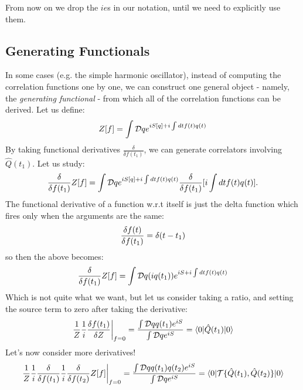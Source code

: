 From now on we drop the $ie$s in our notation, until we need to explicitly use them.

\subsection{Generating Functionals}
In some cases (e.g. the simple harmonic oscillator), instead of computing the correlation functions one by one, we can construct one general object - namely, the \emph{generating functional} - from which all of the correlation functions can be derived. Let us define:
\begin{equation}
    Z[f] = \int \mathcal{D} q e^{iS[q] + i\int dt f(t)q(t)}
\end{equation} 
By taking functional derivatives $\frac{\delta}{\delta f(t_1)}$, we can generate correlators involving $\hat{Q}(t_1)$. Let us study:
\begin{equation}
    \frac{\delta }{\delta f(t_1)}Z[f] = \int \mathcal{D} q e^{iS[q] + i\int dt f(t)q(t)}\frac{\delta }{\delta f(t_1)}[i\int dt f(t)q(t)].
\end{equation}
The functional derivative of a function w.r.t itself is just the delta function which fires only when the arguments are the same:
\begin{equation}
    \frac{\delta f(t)}{\delta f(t_1)} = \delta(t - t_1)
\end{equation}
so then the above becomes:
\begin{equation}
    \frac{\delta }{\delta f(t_1)}Z[f] = \int \mathcal{D} q (iq(t_1))e^{iS + i\int dt f(t)q(t)}
\end{equation}
Which is not quite what we want, but let us consider taking a ratio, and setting the source term to zero after taking the derivative:
\begin{equation}
    \left.\frac{1}{Z}\frac{1}{i}\frac{\delta f(t_1)}{\delta Z}\right|_{f = 0} = \frac{\int \mathcal{D} q q(t_1)e^{iS}}{\int \mathcal{D} q e^{iS}} = \langle 0 \rvert\hat{Q}(t_1)\lvert 0 \rangle
\end{equation}
Let's now consider more derivatives!
\begin{equation}
    \left.\frac{1}{Z}\frac{1}{i}\frac{\delta }{\delta f(t_1)}\frac{1}{i}\frac{\delta }{\delta f(t_2)}Z[f]\right|_{f=0} = \frac{\int \mathcal{D} q q(t_1)q(t_2)e^{iS}}{\int \mathcal{D} q e^{iS}} = \langle 0 \rvert\mathcal{T}\{\hat{Q}(t_1), \hat{Q}(t_2)\}\lvert 0 \rangle
\end{equation}

